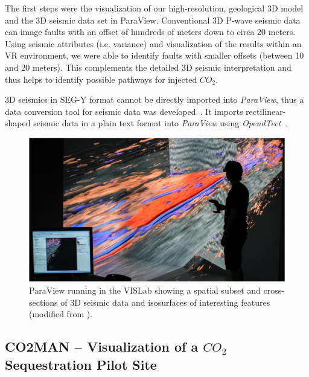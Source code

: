 \documentclass[twocolumn]{svjour3}          %
\begin{document}
The first steps were the visualization of our high-resolution, geological 3D model and the 3D seismic data set in ParaView. Conventional 3D P-wave seismic data can image faults with an offset of hundreds of meters down to circa 20 meters. Using seismic attributes (i.e. variance) and visualization of the results within an VR environment, we were able to identify faults with smaller offsets (between 10 and 20 meters). This complements the detailed 3D seismic interpretation and thus helps to identify possible pathways for injected $CO_{2}$.

3D seismics in SEG-Y format cannot be directly imported into \emph{ParaView}, thus a data conversion tool for seismic data was developed~\cite{bilke:simpleseismicreader}. It imports rectilinear-shaped seismic data in a plain text format into \emph{ParaView} using \emph{OpendTect}~\cite{web:opendtect}.

\begin{figure}[htb]
  \includegraphics[width=\linewidth]{images/seismic.jpg}
\caption{ParaView running in the VISLab showing a spatial subset and cross-sections of 3D seismic data and isosurfaces of interesting features (modified from \cite{krawczyk:deformation}).}
\label{fig:seismic}
\end{figure}


\subsection{CO2MAN -- Visualization of a  $CO_{2}$ Sequestration Pilot Site}
\label{co2man}
\end{document}

